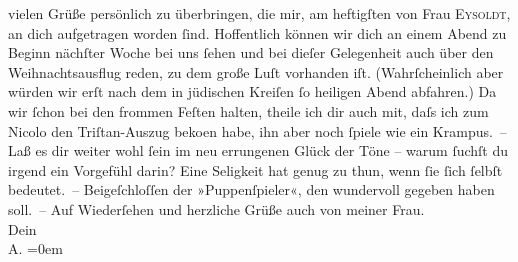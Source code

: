\begin{ledgroupsized}[t]{13cm}
               vielen Grüße persönlich zu überbringen, die mir, am heftigſten von Frau \textsc{Eysoldt}, an dich aufgetragen worden ſind. Hoffentlich können wir dich an einem Abend zu
               Beginn nächſter Woche bei uns ſehen {\pb}und bei dieſer
               Gelegenheit auch über den Weihnachtsausflug reden, zu dem große Luſt vorhanden iſt.
               (Wahrſcheinlich aber würden wir erſt nach dem in jüdischen Kreiſen ſo heiligen Abend
               abfahren.) Da wir ſchon bei den frommen Feſten halten, theile ich dir auch mit, daſs
               ich zum Nicolo den Triſtan-Auszug beko{\geminationm}en habe, ihn aber {\pb}noch ſpiele wie ein
               Krampus. –\pend
           \pstart
           Laß es dir weiter wohl ſein im neu errungenen Glück der Töne – warum ſuchſt du irgend
               ein Vorgefühl darin? Eine Seligkeit hat genug 
               zu thun, wenn ſie ſich ſelbſt bedeutet. – \pend
           \pstart
           Beigeſchloſſen der »Puppenſpieler«, den \label{K_L01475-2v}\label{K_L01475-2h} wundervoll gegeben haben soll. –\pend
           \pstart
           Auf Wiederſehen und herzliche Grüße {\pb}auch von meiner Frau.{\\[\baselineskip]}Dein{\\[\baselineskip]}\spacefill\mbox{A.}\pend
           \leftskip=0em{}
         
         \endnumbering{}\end{ledgroupsized}  \newcommand{\dateiname}{L01475}\newcommand{\titel}{Arthur Schnitzler an Hermann Bahr, 5. 12. 1904}\newcommand{\editorInnen}{ Kurt Ifkovits,  Martin Anton Müller}
      